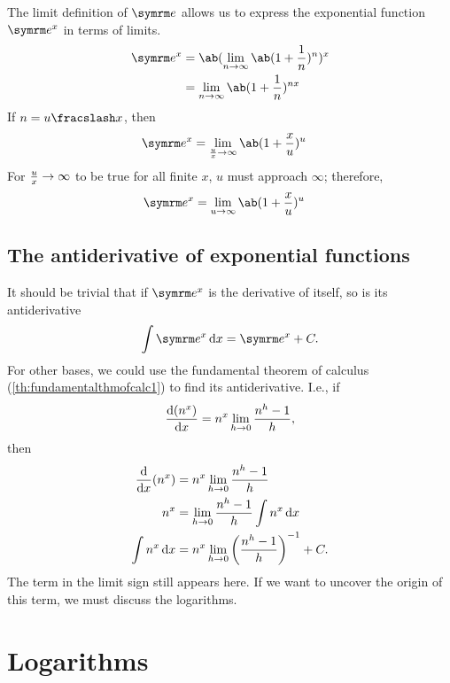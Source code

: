 The limit definition of $\e$ allows us to express the exponential function $\e^x$ in terms of limits.
\begin{align}
  \e^x & = \ab(\lim_{n \appr \infty}\ab(1 + \frac{1}{n})^n)^x \\
       & = \lim_{n \appr \infty}\ab(1 + \frac{1}{n})^{nx}
\end{align}
If $n = \flatfrac{u}{x}$, then
\begin{align}
  \e^x & = \lim_{\frac{u}{x} \appr \infty}\ab(1 + \frac{x}{u})^{u}
\end{align}
For $\frac{u}{x} \rightarrow \infty$ to be true for all finite $x$, $u$ must approach $\infty$; therefore,
\begin{align}
  \e^x & = \lim_{u \appr \infty}\ab(1 + \frac{x}{u})^u
\end{align}

\subsection{The antiderivative of exponential functions}

It should be trivial that if $\e^x$ is the derivative of itself, so is its antiderivative
\begin{equation}
  \int \e^x \odif{x} = \e^x + C.
\end{equation}
For other bases, we could use the fundamental theorem of calculus (\cref{th:fundamentalthmofcalc1}) to find its antiderivative. I.e., if
\begin{equation*}
  \odv{(n^x)}{x} = n^x\lim_{h \appr 0}\frac{n^h - 1}{h},
\end{equation*}
then
\begin{align*}
  \odv*{(n^x)}{x}  & = n^x\lim_{h \appr 0}\frac{n^h - 1}{h}                         \\
  n^x              & = \lim_{h \appr 0}\frac{n^h - 1}{h}\int n^x\odif{x}            \\
  \int n^x\odif{x} & = n^x\lim_{h \appr 0}\left(\frac{n^h - 1}{h}\right)^{-1} + C.
\end{align*}
The term in the limit sign still appears here. If we want to uncover the origin of this term, we must discuss the logarithms.

\section{Logarithms}
\label{sec:logarithms}

